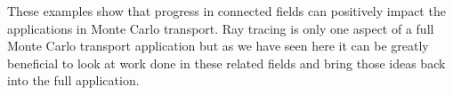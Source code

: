 These examples show that progress in connected fields can positively impact the applications in Monte Carlo transport.
%
Ray tracing is only one aspect of a full Monte Carlo transport application but as we have seen here it can be greatly beneficial to look at work done in these related fields and bring those ideas back into the full application.

